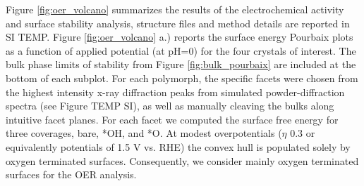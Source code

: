 Figure \ref{fig:oer_volcano} summarizes the results of the electrochemical activity and surface stability analysis, structure files and method details are reported in SI TEMP.
%
Figure \ref{fig:oer_volcano} a.) reports the surface energy Pourbaix plots as a function of applied potential (at pH\num{=0}) for the four \IrOx crystals of interest.
%
The bulk phase limits of stability from Figure \ref{fig:bulk_pourbaix} are included at the bottom of each subplot.
%
For each polymorph, the specific facets were chosen from the highest intensity x-ray diffraction peaks from simulated powder-diffraction spectra\cite{Momma2011} (see Figure TEMP SI),
as well as manually cleaving the bulks along intuitive facet planes.
%
For each facet we computed the surface free energy for three coverages, bare, *OH, and *O.
%
%
At modest overpotentials ($\eta$ \mytilde\num{0.3} or equivalently potentials of \mytilde\num{1.5} V vs. RHE) the convex hull is populated solely by oxygen terminated surfaces.
%
Consequently, we consider mainly oxygen terminated surfaces for the OER analysis.


